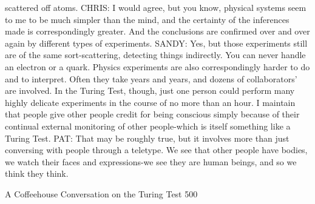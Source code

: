    scattered off atoms.
CHRIS: I would agree, but you know, physical systems seem to me to be much
   simpler than the mind, and the certainty of the inferences made is
   correspondingly greater. And the conclusions are confirmed over and over again
   by different types of experiments.
SANDY: Yes, but those experiments still are of the same sort-scattering, detecting
   things indirectly. You can never handle an electron or a quark. Physics
   experiments are also correspondingly harder to do and to interpret. Often they
   take years and years, and dozens of collaborators' are involved. In the Turing
   Test, though, just one person could perform many highly delicate experiments in
   the course of no more than an hour. I maintain that people give other people
   credit for being conscious simply because of their continual external monitoring
   of other people-which is itself something like a Turing Test.
PAT: That may be roughly true, but it involves more than just conversing with people
   through a teletype. We see that other people have bodies, we watch their faces
   and expressions-we see they are human beings, and so we think they think.


A Coffeehouse Conversation on the Turing Test                                      500

